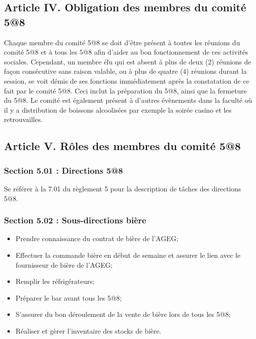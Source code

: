\subsection*{Article IV. Obligation des membres du comité 5@8}
Chaque membre du comité 5@8 se doit d’être présent à toutes les réunions du comité 5@8 et à tous les 5@8 afin d’aider au bon fonctionnement de ces activités sociales. Cependant, un membre élu qui est absent à plus de deux (2) réunions de façon consécutive sans raison valable, ou à plus de quatre (4) réunions durant la session, se voit démis de ses fonctions immédiatement après la constatation de ce fait par le comité 5@8. Ceci inclut la préparation du 5@8, ainsi que la fermeture du 5@8. Le comité est également présent à d’autres évènements dans la faculté où il y a distribution de boissons alcoolisées par exemple la soirée casino et les retrouvailles.

\subsection*{Article V. Rôles des membres du comité 5@8}

\subsubsection*{Section 5.01 : Directions 5@8}
Se référer à la 7.01 du règlement 5 pour la description de tâches des directions 5@8.

\subsubsection*{Section 5.02 : Sous-directions bière}
\begin{itemize}
\item Prendre connaissance du contrat de bière de l’AGEG;
\item Effectuer la commande bière en début de semaine et assurer le lien avec le fournisseur de bière de l’AGEG;
\item Remplir les réfrigérateurs;
\item Préparer le bar avant tous les 5@8;
\item S’assurer du bon déroulement de la vente de bière lors de tous les 5@8;
\item Réaliser et gèrer l’inventaire des stocks de bière.
\end{itemize}

